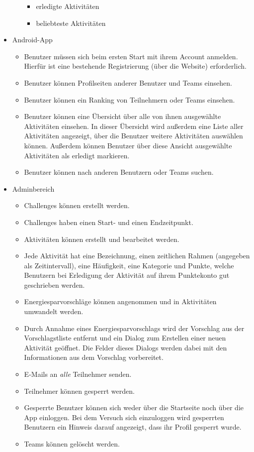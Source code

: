 \documentclass[10pt,a4paper]{article}
\begin{document}
\begin{itemize}
\begin{itemize}
\begin{itemize}
				\item erledigte Aktivitäten
				\item beliebteste Aktivitäten
			\end{itemize}
		\end{itemize}
		\item Android-App
		\begin{itemize}
			\item Benutzer müssen sich beim ersten Start mit ihrem Account anmelden. Hierfür ist eine bestehende Registrierung (über die Website) erforderlich.
			\item Benutzer können Profilseiten anderer Benutzer und Teams einsehen.
			\item Benutzer können ein Ranking von Teilnehmern oder Teams einsehen.
			\item Benutzer können eine Übersicht über alle von ihnen ausgewählte Aktivitäten einsehen. In dieser Übersicht wird außerdem eine Liste aller Aktivitäten angezeigt, über die Benutzer weitere Aktivitäten auswählen können. Außerdem können Benutzer über diese Ansicht ausgewählte Aktivitäten als erledigt markieren.
			\item Benutzer können nach anderen Benutzern oder Teams suchen. 
		\end{itemize}
		\item Adminbereich
		\begin{itemize}
			\item Challenges können erstellt werden.
                        \item Challenges haben einen Start- und einen Endzeitpunkt.
			\item Aktivitäten können erstellt und bearbeitet werden.
                        \item Jede Aktivität hat eine Bezeichnung, einen zeitlichen Rahmen (angegeben als Zeitintervall), eine Häufigkeit, eine Kategorie und Punkte, welche Benutzern bei Erledigung der Aktivität auf ihrem Punktekonto gut geschrieben werden.
			\item Energiesparvorschläge können angenommen und in Aktivitäten umwandelt werden.
                        \item Durch Annahme eines Energiesparvorschlags wird der Vorschlag aus der Vorschlagstliste entfernt und ein Dialog zum Erstellen einer neuen Aktivität geöffnet. Die Felder dieses Dialogs werden dabei mit den Informationen aus dem Vorschlag vorbereitet.
			\item E-Mails an \emph{alle} Teilnehmer senden.
			\item Teilnehmer können gesperrt werden.
                        \item Gesperrte Benutzer können sich weder über die Startseite noch über die App einloggen. Bei dem Versuch sich einzuloggen wird gesperrten Benutzern ein Hinweis darauf angezeigt, dass ihr Profil gesperrt wurde.
                        \item Teams können gelöscht werden.
		\end{itemize}
	\end{itemize}
\end{document}
